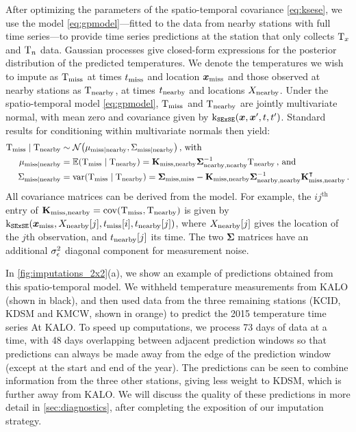 \documentclass[12pt]{article}
\begin{document}
After optimizing the parameters of the spatio-temporal covariance \autoref{eq:ksese}, we use the model \autoref{eq:gpmodel}---fitted to the data from nearby stations with full time series---to provide time series predictions at the station that only collects \(\mathrm{T}_{x}\) and \(\mathrm{T}_{n}\) data.
Gaussian processes give closed-form expressions for the posterior distribution of the predicted temperatures.
We denote the temperatures we wish to impute as \(\mathrm{T}_{\mathrm{miss}}{}\) at times \(t_{\mathrm{miss}}\) and location \(\bm{x}_{\mathrm{miss}}\) and those observed at nearby stations as \(\mathrm{T}_{\mathrm{nearby}}{}\), at times \(t_{\mathrm{nearby}}\) and locations \(X_{\mathrm{nearby}}\).
Under the spatio-temporal model \autoref{eq:gpmodel}, \(\mathrm{T}_{\mathrm{miss}}\) and \(\mathrm{T}_{\mathrm{nearby}}\) are jointly multivariate normal, with mean zero and covariance given by \(\operatorname{k_{\mathtt{SExSE}}}(\bm{x},\bm{x}',t,t')\).
Standard results for conditioning within multivariate normals then yield:
\begin{equation}
\begin{split}
    \T_\miss \mid \T_\obs &\sim \normal\del{\mu_{\miss \mid \obs}, \Sigma_{\miss \mid \obs}}\,\text{, with} \\
    \mu_{\miss \mid \obs} &= \E \del{\T_\miss \mid \T_\obs} = \Kmo \Soo^{-1} \T_\obs \,\text{, and} \\
    \Sigma_{\miss \mid \obs} &= \var \del{\T_\miss \mid \T_\obs} = \Smm - \Kmo \Soo^{-1} \Kmo\trans
    \,.
\end{split}
\label{eq:unconstrained_post}
\end{equation}
All covariance matrices can be derived from the model.
For example, the \(ij^{\text{th}}\) entry of \(\Kmo = \cov\del{\T_\miss, \T_\obs}\) is given by \(\kSESE(\xvec_\miss,X_\obs\sbr{j},t_\miss\sbr{i},t_\obs\sbr{j})\), where \(X_\obs\sbr{j}\) gives the location of the \(j\)th observation, and \(t_\obs\sbr{j}\) its time.
The two \(\mathbold{\Sigma}\) matrices have an additional \(\sigma_{\epsilon}^2\) diagonal component for measurement noise.

In \autoref{fig:imputations_2x2}(a), we show an example of predictions obtained from this spatio-temporal model. 
We withheld temperature measurements from KALO (shown in black), and then used data from the three remaining stations (KCID, KDSM and KMCW, shown in orange) to predict the 2015 temperature time series At KALO.
To speed up computations, we process 73 days of data at a time, with 48 days overlapping between adjacent prediction windows so that predictions can always be made away from the edge of the prediction window (except at the start and end of the year).
The predictions can be seen to combine information from the three other stations, giving less weight to KDSM, which is further away from KALO.
We will discuss the quality of these predictions in more detail in \autoref{sec:diagnostics}, after completing the exposition of our imputation strategy.
\end{document}

